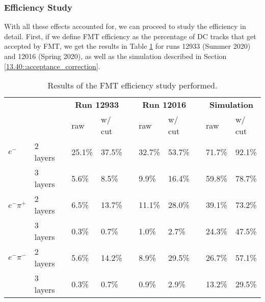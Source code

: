 \subsubsection{Efficiency Study}
\label{14.14::efficiency_study}
    With all these effects accounted for, we can proceed to study the efficiency in detail.
    First, if we define FMT efficiency as the percentage of DC tracks that get accepted by FMT, we get the results in Table \ref{tab::14.14::fmt_efficiency_study} for runs 12933 (Summer 2020) and 12016 (Spring 2020), as well as the simulation described in Section \ref{13.40::acceptance_correction}.

    \begin{table}[b]
        \begin{center}
            \begin{tabularx}{0.92\textwidth}{Xlcllcllcll}
                \toprule
                & & & \multicolumn{2}{c}{\textbf{Run 12933}} & & \multicolumn{2}{c}{\textbf{Run 12016}} & & \multicolumn{2}{c}{\textbf{Simulation}} \\
                                    &          & & raw  & w/ cut   & & raw  & w/ cut   & & raw    & w/ cut \\
                \midrule \midrule
                \textbf{$e^-$}      & 2 layers & & 25.1\% & 37.5\% & & 32.7\% & 53.7\% & & 71.7\% & 92.1\% \\
                                    & 3 layers & &  5.6\% &  8.5\% & &  9.9\% & 16.4\% & & 59.8\% & 78.7\% \\
                \midrule
                \textbf{$e^-\pi^+$} & 2 layers & &  6.5\% & 13.7\% & & 11.1\% & 28.0\% & & 39.1\% & 73.2\% \\
                                    & 3 layers & &  0.3\% &  0.7\% & &  1.0\% &  2.7\% & & 24.3\% & 47.5\% \\
                \midrule
                \textbf{$e^-\pi^-$} & 2 layers & &  5.6\% & 14.2\% & &  8.9\% & 29.5\% & & 26.7\% & 57.1\% \\
                                    & 3 layers & &  0.3\% &  0.7\% & &  0.9\% &  2.9\% & & 13.2\% & 29.5\% \\
                \bottomrule
            \end{tabularx}
        \end{center}
        \caption[FMT efficiency study results]
        {Results of the FMT efficiency study performed.}
        \label{tab::14.14::fmt_efficiency_study}
    \end{table}


